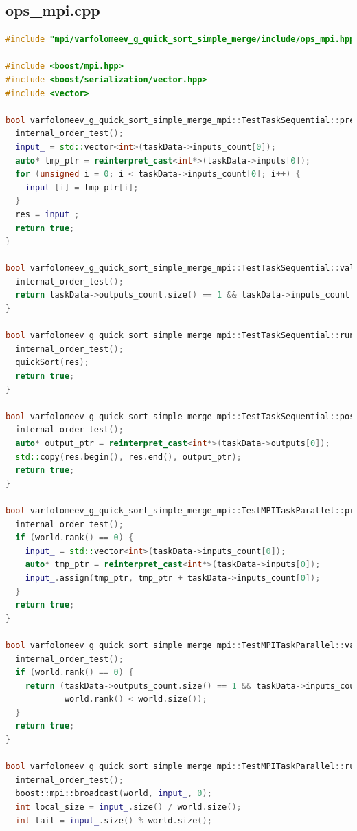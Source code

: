 \documentclass[a4paper,12pt]{article}
\begin{document}
\subsection{ops\_mpi.cpp}
\begin{lstlisting}[language=C++]
#include "mpi/varfolomeev_g_quick_sort_simple_merge/include/ops_mpi.hpp"

#include <boost/mpi.hpp>
#include <boost/serialization/vector.hpp>
#include <vector>

bool varfolomeev_g_quick_sort_simple_merge_mpi::TestTaskSequential::pre_processing() {
  internal_order_test();
  input_ = std::vector<int>(taskData->inputs_count[0]);
  auto* tmp_ptr = reinterpret_cast<int*>(taskData->inputs[0]);
  for (unsigned i = 0; i < taskData->inputs_count[0]; i++) {
    input_[i] = tmp_ptr[i];
  }
  res = input_;
  return true;
}

bool varfolomeev_g_quick_sort_simple_merge_mpi::TestTaskSequential::validation() {
  internal_order_test();
  return taskData->outputs_count.size() == 1 && taskData->inputs_count.size() == 1;
}

bool varfolomeev_g_quick_sort_simple_merge_mpi::TestTaskSequential::run() {
  internal_order_test();
  quickSort(res);
  return true;
}

bool varfolomeev_g_quick_sort_simple_merge_mpi::TestTaskSequential::post_processing() {
  internal_order_test();
  auto* output_ptr = reinterpret_cast<int*>(taskData->outputs[0]);
  std::copy(res.begin(), res.end(), output_ptr);
  return true;
}

bool varfolomeev_g_quick_sort_simple_merge_mpi::TestMPITaskParallel::pre_processing() {
  internal_order_test();
  if (world.rank() == 0) {
    input_ = std::vector<int>(taskData->inputs_count[0]);
    auto* tmp_ptr = reinterpret_cast<int*>(taskData->inputs[0]);
    input_.assign(tmp_ptr, tmp_ptr + taskData->inputs_count[0]);
  }
  return true;
}

bool varfolomeev_g_quick_sort_simple_merge_mpi::TestMPITaskParallel::validation() {
  internal_order_test();
  if (world.rank() == 0) {
    return (taskData->outputs_count.size() == 1 && taskData->inputs_count.size() == 1 && world.size() > 0 &&
            world.rank() < world.size());
  }
  return true;
}

bool varfolomeev_g_quick_sort_simple_merge_mpi::TestMPITaskParallel::run() {
  internal_order_test();
  boost::mpi::broadcast(world, input_, 0);
  int local_size = input_.size() / world.size();
  int tail = input_.size() % world.size();


\end{lstlisting}
\end{document}
